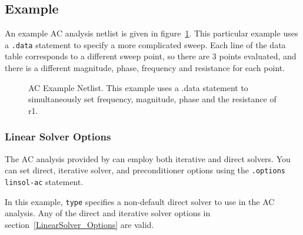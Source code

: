 \subsection{Example}
An example AC analysis netlist is given in figure~\ref{acExample}.
This particular example uses a \texttt{.data} statement to specify a
more complicated sweep.  Each line of the data table corresponds to a
different sweep point, so there are 3 points evaluated, and there is a
different magnitude, phase, frequency and resistance for each point.
\begin{figure}[htbp]
  \begin{centering}
\caption[AC Example Netlist]
{AC Example Netlist.  This example uses a .data statement to simultaneously set frequency, magnitude, phase and the resistance of r1. \label{acExample} }
\end{centering}
\end{figure}

\subsubsection{Linear Solver Options}

The AC analysis provided by \Xyce{} can employ both iterative and
direct solvers. You can set direct, iterative
solver, and preconditioner options using the \verb|.options linsol-ac|
statement.


In this example, \texttt{type} specifies a non-default direct solver
to use in the AC analysis.  Any of the direct and iterative solver options in
section~\ref{LinearSolver_Options} are valid. 

